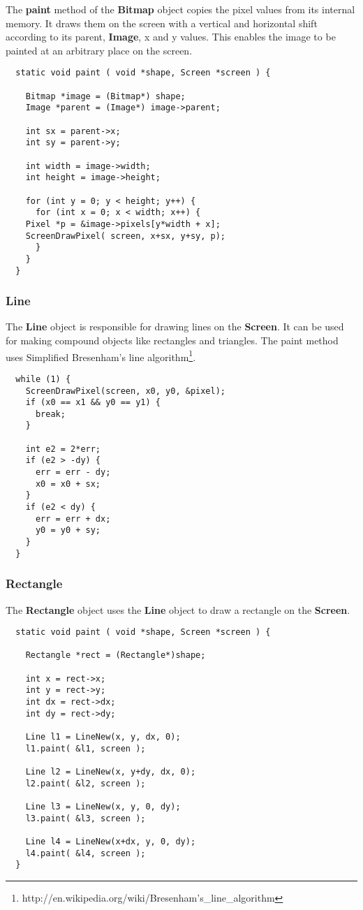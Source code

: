The {\bf paint} method of the {\bf Bitmap} object copies the pixel
values from its internal memory. It draws them on the screen with a
vertical and horizontal shift according to its parent, {\bf Image}, x
and y values. This enables the image to be painted at an arbitrary
place on the screen.
\\
\begin{lstlisting}
  static void paint ( void *shape, Screen *screen ) {

    Bitmap *image = (Bitmap*) shape;
    Image *parent = (Image*) image->parent;

    int sx = parent->x;
    int sy = parent->y;

    int width = image->width;
    int height = image->height;

    for (int y = 0; y < height; y++) {
      for (int x = 0; x < width; x++) {
	Pixel *p = &image->pixels[y*width + x];
	ScreenDrawPixel( screen, x+sx, y+sy, p);
      }
    }
  }
\end{lstlisting}

\subsubsection{Line}
The {\bf Line} object is responsible for drawing lines on the {\bf Screen}. It can be
used for making compound objects like rectangles and triangles. The paint method uses
Simplified Bresenham's line algorithm\footnote{http://en.wikipedia.org/wiki/Bresenham's\_line\_algorithm}.

\begin{lstlisting}
  while (1) {
    ScreenDrawPixel(screen, x0, y0, &pixel);
    if (x0 == x1 && y0 == y1) {
      break;
    }

    int e2 = 2*err;
    if (e2 > -dy) {
      err = err - dy;
      x0 = x0 + sx;
    }
    if (e2 < dy) {
      err = err + dx;
      y0 = y0 + sy;
    }
  }

\end{lstlisting}

\subsubsection{Rectangle}
The {\bf Rectangle} object uses the {\bf Line} object to draw a rectangle on the {\bf Screen}.
\begin{lstlisting}
  static void paint ( void *shape, Screen *screen ) {

    Rectangle *rect = (Rectangle*)shape;

    int x = rect->x;
    int y = rect->y;
    int dx = rect->dx;
    int dy = rect->dy;

    Line l1 = LineNew(x, y, dx, 0);
    l1.paint( &l1, screen );

    Line l2 = LineNew(x, y+dy, dx, 0);
    l2.paint( &l2, screen );

    Line l3 = LineNew(x, y, 0, dy);
    l3.paint( &l3, screen );

    Line l4 = LineNew(x+dx, y, 0, dy);
    l4.paint( &l4, screen );
  }
\end{lstlisting}
